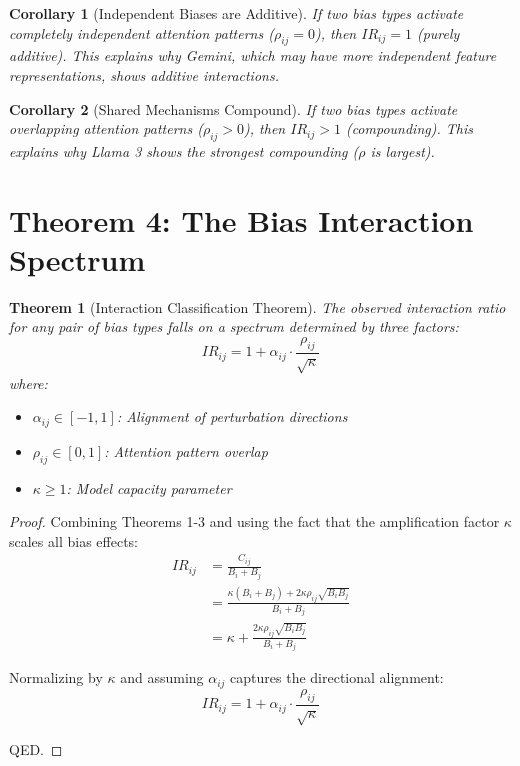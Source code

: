 \documentclass[11pt]{article}
\newtheorem{theorem}{Theorem}
\newtheorem{corollary}{Corollary}
\begin{document}
\begin{corollary}[Independent Biases are Additive]
If two bias types activate completely independent attention patterns ($\rho_{ij} = 0$), then $IR_{ij} = 1$ (purely additive). This explains why Gemini, which may have more independent feature representations, shows additive interactions.
\end{corollary}

\begin{corollary}[Shared Mechanisms Compound]
If two bias types activate overlapping attention patterns ($\rho_{ij} > 0$), then $IR_{ij} > 1$ (compounding). This explains why Llama 3 shows the strongest compounding ($\rho$ is largest).
\end{corollary}

\section{Theorem 4: The Bias Interaction Spectrum}

\begin{theorem}[Interaction Classification Theorem]
The observed interaction ratio for any pair of bias types falls on a spectrum determined by three factors:
\begin{equation}
IR_{ij} = 1 + \alpha_{ij} \cdot \frac{\rho_{ij}}{\sqrt{\kappa}}
\end{equation}
where:
\begin{itemize}
    \item $\alpha_{ij} \in [-1, 1]$: Alignment of perturbation directions
    \item $\rho_{ij} \in [0, 1]$: Attention pattern overlap
    \item $\kappa \geq 1$: Model capacity parameter
\end{itemize}
\end{theorem}

\begin{proof}
Combining Theorems 1-3 and using the fact that the amplification factor $\kappa$ scales all bias effects:
\begin{align}
IR_{ij} &= \frac{C_{ij}}{B_i + B_j} \\
&= \frac{\kappa(B_i + B_j) + 2\kappa\rho_{ij}\sqrt{B_i B_j}}{B_i + B_j} \\
&= \kappa + \frac{2\kappa\rho_{ij}\sqrt{B_i B_j}}{B_i + B_j}
\end{align}

Normalizing by $\kappa$ and assuming $\alpha_{ij}$ captures the directional alignment:
\begin{equation}
IR_{ij} = 1 + \alpha_{ij} \cdot \frac{\rho_{ij}}{\sqrt{\kappa}}
\end{equation}

QED.
\end{proof}
\end{document}
